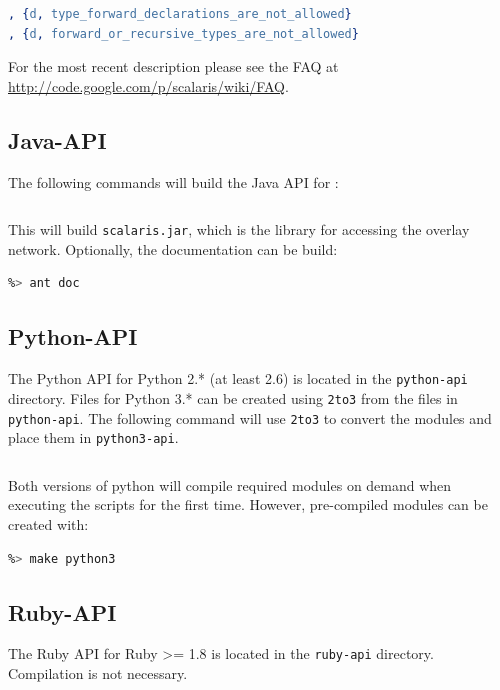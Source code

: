 \documentclass[a4paper]{scrreprt}
\newcommand{\code}[1]{\lstinline[basicstyle=\ttfamily]!#1!}
\begin{document}
\begin{lstlisting}[language=erlang]
, {d, type_forward_declarations_are_not_allowed}
, {d, forward_or_recursive_types_are_not_allowed}
\end{lstlisting}

For the most recent description please see the FAQ at
\url{http://code.google.com/p/scalaris/wiki/FAQ}.

\subsection{Java-API}

The following commands will build the Java API for \scalaris{}:
\begin{lstlisting}[language=sh]
%> make java
\end{lstlisting}

This will build {\tt scalaris.jar}, which is the library for accessing
the overlay network. Optionally, the documentation can be build:
\begin{lstlisting}[language=sh]
%> cd java-api
%> ant doc
\end{lstlisting}

\subsection{Python-API}

The Python API for Python 2.* (at least 2.6) is located in the \code{python-api}
directory. Files for Python 3.* can be created using \code{2to3} from the files
in \code{python-api}. The following command will use \code{2to3} to convert the
modules and place them in \code{python3-api}. 
\begin{lstlisting}[language=sh]
%> make python3
\end{lstlisting}
Both versions of python will compile required modules on demand when executing
the scripts for the first time. However, pre-compiled modules can be created
with:
\begin{lstlisting}[language=sh]
%> make python
%> make python3
\end{lstlisting}

\subsection{Ruby-API}

The Ruby API for Ruby >= 1.8 is located in the \code{ruby-api}
directory. Compilation is not necessary.
\end{document}
